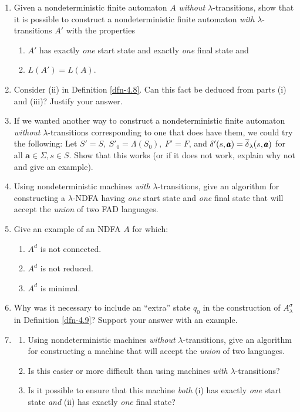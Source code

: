 \begin{enumerate}[{4.}1.]
\item Given a nondeterministic finite automaton $A$ \emph{without}
$\lambda$-transitions, show that it is possible to construct a nondeterministic
finite automaton \emph{with} $\lambda$-transitions $A'$ with the properties
\begin{enumerate}[(1)]
\item $A'$ has exactly \emph{one} start state and exactly \emph{one} final state
and
\item $L(A') = L(A)$.
\end{enumerate}

\item Consider (ii) in Definition \ref{dfn-4.8}. Can this fact be deduced from parts (i)
and (iii)? Justify your answer.

\item If we wanted another way to construct a nondeterministic finite automaton
\emph{without} $\lambda$-transitions corresponding to one that does have them,
we could try the following: Let $S'=S,\ S'_0=\Lambda(S_0),\ F'=F$, and
$\delta'(s,\pmb{a})=\overline{\delta}_{\lambda}(s,\pmb{a})$ for all $\pmb{a}\in\Sigma,s \in
S$. Show that this works (or if it does not work, explain why not and give an
example).

\item Using nondeterministic machines \emph{with} $\lambda$-transitions, give an
algorithm for constructing a $\lambda$-NDFA having \emph{one} start state and
\emph{one} final state that will accept the \emph{union} of two FAD languages.

\item Give an example of an NDFA $A$ for which:
\begin{enumerate}
\item $A^d$ is not connected.
\item $A^d$ is not reduced.
\item $A^d$ is minimal.
\end{enumerate}

\item Why was it necessary to include an ``extra'' state $q_0$ in the
construction of $A^{\sigma}_{\lambda}$ in Definition \ref{dfn-4.9}? Support your answer
with an example.

\item \begin{enumerate}
\item Using nondeterministic machines \emph{without} $\lambda$-transitions, give
an algorithm for constructing a machine that will accept the \emph{union} of two
languages.
\item Is this easier or more difficult than using machines \emph{with}
$\lambda$-transitions?
\item Is it possible to ensure that this machine \emph{both} (i) has exactly
\emph{one} start state \emph{and} (ii) has exactly \emph{one} final state?
\end{enumerate}


\end{enumerate}
